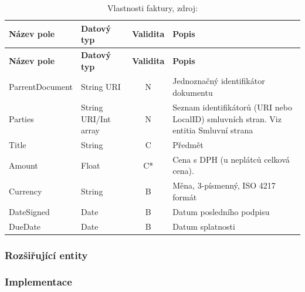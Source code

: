 \begin{center}
\begin{longtable}{lp{20mm}cp{65mm}}
\label{grid_mlmmh} \\
\multicolumn{1}{l}{\textbf{Název pole}} & 
\multicolumn{1}{l}{\textbf{Datový typ}} & 
\multicolumn{1}{l}{\textbf{Validita}} & 
\multicolumn{1}{l}{\textbf{Popis}} \\ \hline 
\endfirsthead
\multicolumn{1}{l}{\textbf{Název pole}} & 
\multicolumn{1}{l}{\textbf{Datový typ}} & 
\multicolumn{1}{l}{\textbf{Validita}} & 
\multicolumn{1}{l}{\textbf{Popis}} \\ \hline 
\hline
\endhead
\endfoot
\caption[Vlastnosti faktury]{Vlastnosti faktury, zdroj:\cite{metodika, standard}}
\endlastfoot
ParrentDocument & String URI & N & Jednoznačný identifikátor dokumentu \\
Parties & String URI/Int array & N & Seznam identifikátorů (URI nebo LocalID) smluvních stran. Viz entitia Smluvní strana \\
\rowcolor{validateC}Title & String & C & Předmět \\
\rowcolor{validateC}Amount & Float & C* & Cena s DPH (u neplátců celková cena). \\
\rowcolor{validateB}Currency & String & B & Měna, 3-písmenný, ISO 4217 formát \\
\rowcolor{validateB}DateSigned & Date & B & Datum posledního podpisu \\
\rowcolor{validateB}DueDate & Date & B & Datum splatnosti \\
\end{longtable}
\end{center}

\subsubsection*{Rozšiřující entity}

\subsubsection*{Implementace}

